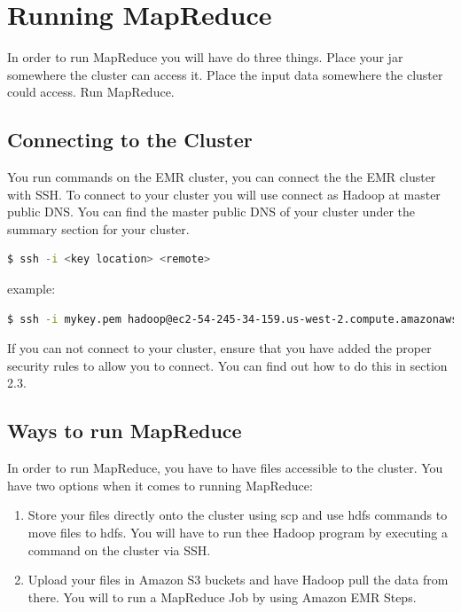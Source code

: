 \documentclass{article}
\begin{document}

\section{Running MapReduce}
In order to run MapReduce you will have do three things. Place your jar somewhere the cluster can access it. Place the input data somewhere the cluster could access. Run MapReduce. 
\subsection{Connecting to the Cluster}
You run commands on the EMR cluster, you can connect the the EMR cluster with SSH. To connect to your cluster you will use connect as Hadoop at master public DNS. You can find the master public DNS of your cluster under the summary section for your cluster.
\begin{lstlisting}[language=bash]
  $ ssh -i <key location> <remote>
\end{lstlisting}
example:
\begin{lstlisting}[language=bash]
  $ ssh -i mykey.pem hadoop@ec2-54-245-34-159.us-west-2.compute.amazonaws.com
\end{lstlisting}

\begin{info}
If you can not connect to your cluster, ensure that you have added the proper security rules to allow you to connect. You can find out how to do this in section 2.3. 
\end{info}

\subsection{Ways to run MapReduce }
In order to run MapReduce, you have to have files accessible to the cluster. You have two options when it comes to running MapReduce: 
\begin{enumerate} 
\item Store your files directly onto the cluster using scp and use hdfs commands to move files to hdfs. You will have to run thee Hadoop program by executing a command on the cluster via SSH. 
\item Upload your files in Amazon S3 buckets and have Hadoop pull the data from there. You will to run a MapReduce Job by using Amazon EMR Steps.
\end{enumerate}
\end{document}
